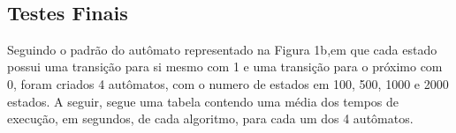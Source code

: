 \documentclass[12pt]{article}
\begin{document}
\begin{figure}[ht!]
  \centering
  \\
\end{figure}


\subsection{Testes Finais}
Seguindo o padrão do autômato representado na Figura 1b,em que cada estado possui uma transição para si mesmo com 1 e uma transição para o próximo com 0, foram criados 4 autômatos, com o numero de estados em 100, 500, 1000 e 2000 estados.
A seguir, segue uma tabela contendo uma média dos tempos de execução, em segundos, de cada algoritmo, para cada um dos 4 autômatos. 
\\  
\\
\\
\end{document}
